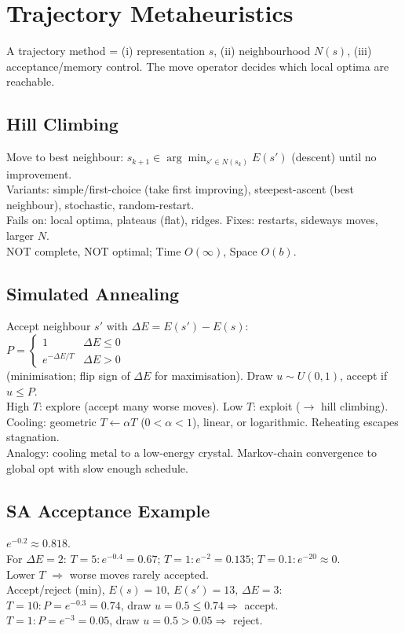 \section{Trajectory Metaheuristics}

A trajectory method = (i) representation \(s\), (ii) neighbourhood \(N(s)\), (iii) acceptance/memory control. The move operator decides which local optima are reachable.

\subsection*{Hill Climbing}
Move to best neighbour: \( s_{k+1}\in\arg\min_{s'\in N(s_k)} E(s') \) (descent) until no improvement.\\
Variants: simple/first-choice (take first improving), steepest-ascent (best neighbour), stochastic, random-restart.\\
Fails on: local optima, plateaus (flat), ridges. Fixes: restarts, sideways moves, larger \(N\).\\
NOT complete, NOT optimal; Time \( O(\infty) \), Space \( O(b) \).

\subsection*{Simulated Annealing}
Accept neighbour \(s'\) with \( \Delta E=E(s')-E(s) \):\\
\(
P=\begin{cases}1 & \Delta E\le 0\\ e^{-\Delta E/T} & \Delta E>0\end{cases}
\)\\
(minimisation; flip sign of \(\Delta E\) for maximisation). Draw \( u\sim U(0,1) \), accept if \( u\le P \).\\
High \(T\): explore (accept many worse moves). Low \(T\): exploit (\(\to\) hill climbing).\\
Cooling: geometric \( T\leftarrow\alpha T \) (\(0{<}\alpha{<}1\)), linear, or logarithmic. Reheating escapes stagnation.\\
Analogy: cooling metal to a low-energy crystal. Markov-chain convergence to global opt with slow enough schedule.

\subsection*{SA Acceptance Example}
\( e^{-0.2}\approx 0.818 \).\\
For \( \Delta E=2 \): \(T{=}5\!:e^{-0.4}{=}0.67\); \(T{=}1\!:e^{-2}{=}0.135\); \(T{=}0.1\!:e^{-20}\!\approx\!0\).\\
Lower \(T\) \(\Rightarrow\) worse moves rarely accepted.\\
Accept/reject (min), \(E(s){=}10,\,E(s'){=}13,\,\Delta E{=}3\):\\
\(T{=}10\!:P=e^{-0.3}=0.74\), draw \(u{=}0.5\le0.74\Rightarrow\) accept.\\
\(T{=}1\!:P=e^{-3}=0.05\), draw \(u{=}0.5>0.05\Rightarrow\) reject.

